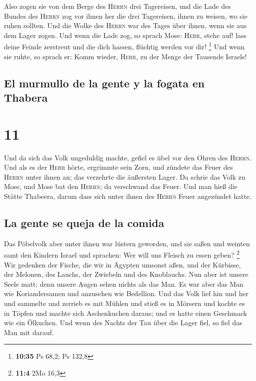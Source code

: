  Also zogen sie von dem Berge des \textsc{Herrn} drei
Tagereisen, und die Lade des Bundes des \textsc{Herrn} zog vor ihnen her
die drei Tagereisen, ihnen zu weisen, wo sie ruhen sollten.
 Und die Wolke des \textsc{Herrn} war des Tages über
ihnen, wenn sie aus dem Lager zogen.  Und wenn die Lade
zog, so sprach Mose: \textsc{Herr}, stehe auf! lass deine Feinde
zerstreut und die dich hassen, flüchtig werden vor dir! \footnote{\textbf{10:35}
  Ps 68,2; Ps 132,8}  Und wenn sie ruhte, so sprach er:
Komm wieder, \textsc{Herr}, zu der Menge der Tausende Israels!

\hypertarget{el-murmullo-de-la-gente-y-la-fogata-en-thabera}{%
\subsection{El murmullo de la gente y la fogata en
Thabera}\label{el-murmullo-de-la-gente-y-la-fogata-en-thabera}}

\hypertarget{section-10}{%
\section{11}\label{section-10}}

 Und da sich das Volk ungeduldig machte, gefiel es übel
vor den Ohren des \textsc{Herrn}. Und als es der \textsc{Herr} hörte,
ergrimmte sein Zorn, und zündete das Feuer des \textsc{Herrn} unter
ihnen an; das verzehrte die äußersten Lager.  Da schrie
das Volk zu Mose, und Mose bat den \textsc{Herrn}; da verschwand das
Feuer.  Und man hieß die Stätte Thabeera, darum dass sich
unter ihnen des \textsc{Herrn} Feuer angezündet hatte.

\hypertarget{la-gente-se-queja-de-la-comida}{%
\subsection{La gente se queja de la
comida}\label{la-gente-se-queja-de-la-comida}}

 Das Pöbelvolk aber unter ihnen war lüstern geworden, und
sie saßen und weinten samt den Kindern Israel und sprachen: Wer will uns
Fleisch zu essen geben? \footnote{\textbf{11:4} 2Mo 16,3} 
Wir gedenken der Fische, die wir in Ägypten umsonst aßen, und der
Kürbisse, der Melonen, des Lauchs, der Zwiebeln und des Knoblauchs.
 Nun aber ist unsere Seele matt; denn unsere Augen sehen
nichts als das Man.  Es war aber das Man wie
Koriandersamen und anzusehen wie Bedellion.  Und das Volk
lief hin und her und sammelte und zerrieb es mit Mühlen und stieß es in
Mörsern und kochte es in Töpfen und machte sich Aschenkuchen daraus; und
es hatte einen Geschmack wie ein Ölkuchen.  Und wenn des
Nachts der Tau über die Lager fiel, so fiel das Man mit darauf.

